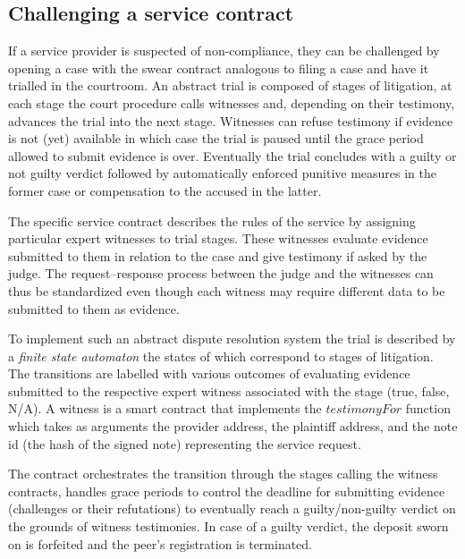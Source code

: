 \subsection{Challenging a service contract}
\label{sec:swindle}

If a service provider is suspected of non-compliance, they can be challenged
by opening a case with the swear contract analogous to filing a case and have it 
trialled in the courtroom.
An abstract trial is composed of stages of litigation, at each stage
the court procedure calls witnesses and, depending on their testimony,
advances the trial into the next stage. Witnesses can refuse testimony
if evidence is not (yet) available in which case the trial
is paused until the grace period allowed to submit evidence is over.
Eventually the trial concludes with a guilty or not guilty verdict followed
by automatically enforced punitive measures in the former case or
compensation to the accused in the latter.

The specific service contract describes the rules of the service
by assigning particular expert witnesses to trial stages. These witnesses
evaluate evidence submitted to them in relation to the case
and give testimony if asked by the judge.
The request--response process between the judge and the witnesses can
thus be standardized
even though each witness may require different data to be submitted to them as evidence.

To implement such an abstract dispute resolution system
the trial is described by a \emph{finite state automaton} the states of which correspond to stages of litigation. 
The transitions are labelled with various outcomes of evaluating evidence submitted
to the respective expert witness associated with the stage (true, false, N/A). A witness
is a smart contract that implements the $\mathit{testimonyFor}$ function which takes
as arguments the provider address, the plaintiff address, and the note id (the hash of the signed note)
representing the service request.

The  contract orchestrates the transition through the stages calling the witness contracts,
handles grace periods to control the deadline for submitting evidence (challenges or their refutations) to
eventually reach a guilty/non-guilty verdict on the grounds of witness testimonies.
In case of a guilty verdict, the deposit sworn on is forfeited and the peer's registration is
terminated. 

